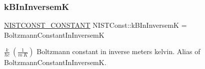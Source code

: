 \subsubsection{\texorpdfstring{k\+B\+In\+InversemK}{kBInInversemK}}
{\footnotesize\ttfamily \mbox{\hyperlink{group___n_i_s_t_const-_macros_ga2b0fc1d7452373f816175dd86ce26729}{N\+I\+S\+T\+C\+O\+N\+S\+T\+\_\+\+C\+O\+N\+S\+T\+A\+NT}} N\+I\+S\+T\+Const\+::k\+B\+In\+InversemK = Boltzmann\+Constant\+In\+InversemK}

$\frac{k}{h c} \ (\frac{1}{m\ K})$ Boltzmann constant in inverse meters kelvin. Alias of Boltzmann\+Constant\+In\+InversemK. 